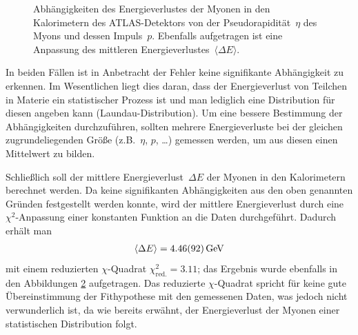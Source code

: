 \documentclass[11pt, a4paper]{article}
\numberwithin{equation}{section}
\begin{document}
\begin{figure}[hp]
\begin{subfigure}{1.0\textwidth}
			\subcaption{}
			\label{fig:muon_eloss_momentum}
	\end{subfigure}
	\caption{Abhängigkeiten des Energieverlustes der Myonen in den Kalorimetern des ATLAS-Detektors von der Pseudorapidität~$\eta$ des Myons und dessen Impuls~$p$. Ebenfalls aufgetragen ist eine Anpassung des mittleren Energieverlustes~$\langle \Delta E \rangle$.}
	\label{fig:muon_eloss}
\end{figure}

In beiden Fällen ist in Anbetracht der Fehler keine signifikante Abhängigkeit zu erkennen.
Im Wesentlichen liegt dies daran, dass der Energieverlust von Teilchen in Materie ein statistischer Prozess ist und man lediglich eine Distribution für diesen angeben kann (Laundau-Distribution).
Um eine bessere Bestimmung der Abhängigkeiten durchzuführen, sollten mehrere Energieverluste bei der gleichen zugrundeliegenden Größe (z.B.\ $\eta$, $p$, \dots) gemessen werden, um aus diesen einen Mittelwert zu bilden.

Schließlich soll der mittlere Energieverlust~$\Delta E$ der Myonen in den Kalorimetern berechnet werden.
Da keine signifikanten Abhängigkeiten aus den oben genannten Gründen festgestellt werden konnte, wird der mittlere Energieverlust durch eine $\chi^2$-Anpassung einer konstanten Funktion an die Daten durchgeführt.
Dadurch erhält man
\begin{align*}
	\langle \Delta E \rangle = \SI{4.46 +- 0.92}{\GeV}
\end{align*}
mit einem reduzierten $\chi$-Quadrat $\chi_\mathrm{red.}^2 = \num{3.11}$; das Ergebnis wurde ebenfalls in den Abbildungen \ref{fig:muon_eloss} aufgetragen.
Das reduzierte $\chi$-Quadrat spricht für keine gute Übereinstimmung der Fithypothese mit den gemessenen Daten, was jedoch nicht verwunderlich ist, da wie bereits erwähnt, der Energieverlust der Myonen einer statistischen Distribution folgt.
\end{document}
